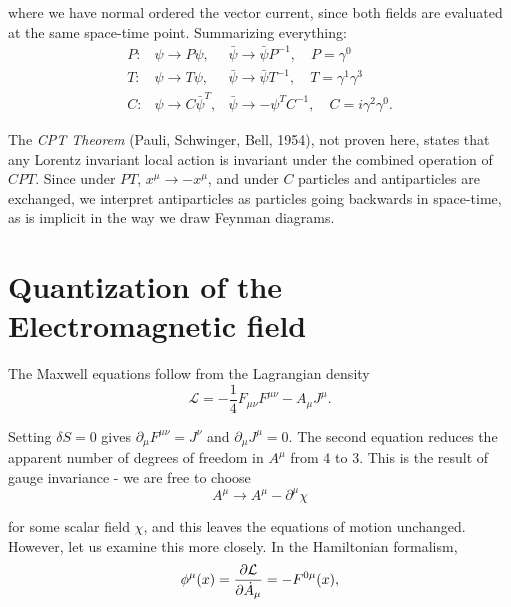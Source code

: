 \documentclass{article}
\numberwithin{equation}{section}
\begin{document}
where we have normal ordered the vector current, since both fields are evaluated at the same space-time point. Summarizing everything:
\begin{equation}
    \begin{array}{lll}
        P: & \psi \rightarrow P \psi, & \bar{\psi} \rightarrow \bar{\psi} P^{-1}, \quad P=\gamma^0 \\
        T: & \psi \rightarrow T \psi, & \bar{\psi} \rightarrow \bar{\psi} T^{-1}, \quad T=\gamma^1 \gamma^3 \\
        C: & \psi \rightarrow C \bar{\psi}^T, & \bar{\psi} \rightarrow-\psi^T C^{-1}, \quad C=i \gamma^2 \gamma^0.
        \end{array}
\end{equation}

The \textit{CPT Theorem} (Pauli, Schwinger, Bell, 1954), not proven here, states that any Lorentz invariant local action is invariant under the combined operation of $CPT$. Since under $PT$, $x^\mu \rightarrow -x^\mu$, and under $C$ particles and antiparticles are exchanged, we interpret antiparticles as particles going backwards in space-time, as is implicit in the way we draw Feynman diagrams.

\section{Quantization of the Electromagnetic field}

The Maxwell equations follow from the Lagrangian density 
\begin{equation}
    \mathcal{L} = -\frac{1}{4}F_{\mu\nu} F^{\mu\nu} - A_\mu J^\mu.
\end{equation}

Setting $\delta S = 0$ gives $\partial_\mu F^{\mu\nu} = J^\nu$ and $\partial_\mu J^\mu = 0$. The second equation reduces the apparent number of degrees of freedom in $A^\mu$ from 4 to 3. This is the result of gauge invariance - we are free to choose
\begin{equation}
    A^\mu \rightarrow A^\mu - \partial^\mu \chi
\end{equation}

for some scalar field $\chi$, and this leaves the equations of motion unchanged. However, let us examine this more closely. In the Hamiltonian formalism, 
\begin{equation}
    \phi^\mu(x) = \pdv{\mathcal{L}}{\dot{A}_\mu} = -F^{0\mu}(x),
\end{equation}
\end{document}
